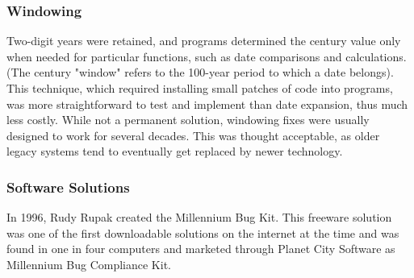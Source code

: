 \documentclass[compilation.tex]{subfiles}
\begin{document}
\subsubsection{Windowing}
Two-digit years were retained, and programs determined the century value only when needed for particular functions, such as date comparisons and calculations. (The century "window" refers to the 100-year period to which a date belongs). This technique, which required installing small patches of code into programs, was more straightforward to test and implement than date expansion, thus much less costly. While not a permanent solution, windowing fixes were usually designed to work for several decades. This was thought acceptable, as older legacy systems tend to eventually get replaced by newer technology.

\subsubsection{Software Solutions}
In 1996, Rudy Rupak created the Millennium Bug Kit. This freeware solution was one of the first downloadable solutions on the internet at the time and was found in one in four computers and marketed through Planet City Software as Millennium Bug Compliance Kit.

\nocite{*}
\end{document}
